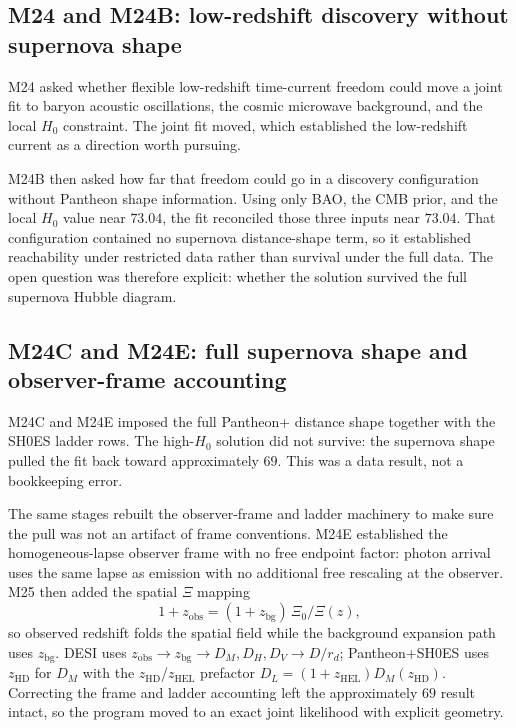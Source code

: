\subsection{M24 and M24B: low-redshift discovery without supernova shape}
\label{app:history-m24-m24b}

M24 asked whether flexible low-redshift time-current freedom could move
a joint fit to baryon acoustic oscillations, the cosmic microwave
background, and the local $H_{0}$ constraint. The joint fit moved, which
established the low-redshift current as a direction worth pursuing.

M24B then asked how far that freedom could go in a discovery
configuration without Pantheon shape information. Using only BAO, the
CMB prior, and the local $H_{0}$ value near $73.04$, the fit reconciled
those three inputs near $73.04$. That configuration contained no
supernova distance-shape term, so it established reachability under
restricted data rather than survival under the full data. The open
question was therefore explicit: whether the solution survived the full
supernova Hubble diagram.

\subsection{M24C and M24E: full supernova shape and observer-frame accounting}
\label{app:history-m24c-m24e}

M24C and M24E imposed the full Pantheon+ distance shape together with
the SH0ES ladder rows. The high-$H_{0}$ solution did not survive: the
supernova shape pulled the fit back toward approximately $69$. This was
a data result, not a bookkeeping error.

The same stages rebuilt the observer-frame and ladder machinery to make
sure the pull was not an artifact of frame conventions. M24E
established the homogeneous-lapse observer frame with no free endpoint
factor: photon arrival uses the same lapse as emission with no
additional free rescaling at the observer. M25 then added the spatial
$\Xi$ mapping
\begin{equation}
1+z_{\mathrm{obs}} = (1+z_{\mathrm{bg}})\,\Xi_{0}/\Xi(z),
\end{equation}
so observed redshift folds the spatial field while the background
expansion path uses $z_{\mathrm{bg}}$. DESI uses
$z_{\mathrm{obs}}\to z_{\mathrm{bg}}\to D_{M},D_{H},D_{V}\to D/r_{d}$;
Pantheon+SH0ES uses $z_{\mathrm{HD}}$ for $D_{M}$ with the
$z_{\mathrm{HD}}$/$z_{\mathrm{HEL}}$ prefactor
$D_{L}=(1+z_{\mathrm{HEL}})D_{M}(z_{\mathrm{HD}})$.
Correcting the frame and ladder accounting left the approximately $69$
result intact, so the program moved to an exact joint likelihood with
explicit geometry.

